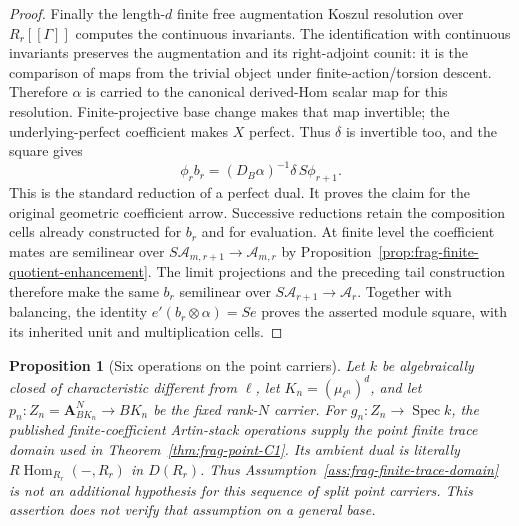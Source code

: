 \documentclass[11pt]{article}
\newtheorem{proposition}[theorem]{Proposition}
\theoremstyle{definition}
\theoremstyle{remark}
\begin{document}
\begin{proof}
Finally the length-$d$ finite free augmentation Koszul resolution over
$R_r[[\Gamma]]$ computes the continuous invariants.  The identification with continuous invariants preserves the augmentation
and its right-adjoint counit: it is the comparison of maps from the
trivial object under finite-action/torsion descent.  Therefore $\alpha$
is carried to the canonical derived-Hom scalar map for this resolution.
Finite-projective base change makes that map invertible; the
underlying-perfect coefficient makes $X$
perfect.  Thus $\delta$ is invertible too, and the square gives
\[
 \phi_r b_r=(D_B\alpha)^{-1}\delta\,S\phi_{r+1}.
\]
This is the standard reduction of a perfect dual.  It proves the
claim for the original geometric coefficient arrow.  Successive
reductions retain the composition cells already constructed for
$b_r$ and for evaluation.  At finite level the coefficient mates
are semilinear over $S\mathcal A_{m,r+1}\to\mathcal A_{m,r}$ by
Proposition~\ref{prop:frag-finite-quotient-enhancement}.
The limit projections and the preceding tail construction therefore
make the same $b_r$ semilinear over $S\mathcal A_{r+1}\to\mathcal A_r$.
Together with balancing, the identity $e'(b_r\otimes\alpha)=Se$
proves the asserted module square, with its inherited unit and
multiplication cells.
\end{proof}

\begin{proposition}[Six operations on the point carriers]
\label{prop:frag-point-finite-domain-verified}
Let $k$ be algebraically closed of characteristic different from $\ell$,
let $K_n=(\mu_{\ell^n})^d$, and let
$p_n:Z_n=\mathbf A^N_{BK_n}\to BK_n$ be the fixed rank-$N$ carrier.
For $g_n:Z_n\to\operatorname{Spec}k$, the published finite-coefficient
Artin-stack operations supply the point finite trace domain used
in Theorem~\ref{thm:frag-point-C1}.  Its ambient dual is literally
$R\operatorname{Hom}_{R_r}(-,R_r)$ in $D(R_r)$.
Thus Assumption~\ref{ass:frag-finite-trace-domain} is not an additional
hypothesis for this sequence of split point carriers.
This assertion does not verify that assumption on a general base.
\end{proposition}
\end{document}
